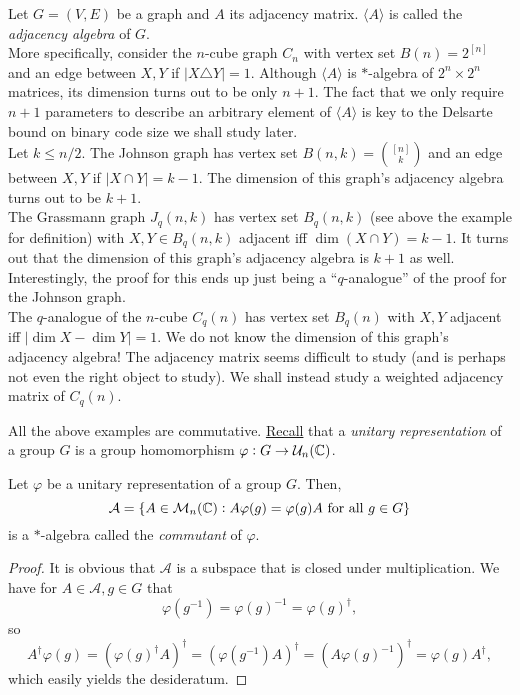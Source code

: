 	\begin{fex}
		\label{exmp: star-alg}
		Let $G = (V,E)$ be a graph and $A$ its adjacency matrix. $\langle A\rangle$ is called the \emph{adjacency algebra} of $G$. \\

		More specifically, consider the $n$-cube graph $C_n$ with vertex set $B(n)=2^{[n]}$ and an edge between $X,Y$ if $|X \triangle Y| = 1$. Although $\langle A\rangle$ is $*$-algebra of $2^n \times 2^n$ matrices, its dimension turns out to be only $n+1$. The fact that we only require $n+1$ parameters to describe an arbitrary element of $\langle A\rangle$ is key to the Delsarte bound on binary code size we shall study later.\\

		Let $k \le n/2$. The Johnson graph has vertex set $B(n,k) = \binom{[n]}{k}$ and an edge between $X,Y$ if $|X \cap Y| = k-1$. The dimension of this graph's adjacency algebra turns out to be $k+1$.\\

		The Grassmann graph $J_q(n,k)$ has vertex set $B_q(n,k)$ (see above the example for definition) with $X,Y \in B_q(n,k)$ adjacent iff $\dim(X \cap Y) = k-1$. It turns out that the dimension of this graph's adjacency algebra is $k+1$ as well. Interestingly, the proof for this ends up just being a ``$q$-analogue'' of the proof for the Johnson graph.\\

		The $q$-analogue of the $n$-cube $C_q(n)$ has vertex set $B_q(n)$ with $X,Y$ adjacent iff $|\dim X - \dim Y| = 1$. We do not know the dimension of this graph's adjacency algebra! The adjacency matrix seems difficult to study (and is perhaps not even the right object to study). We shall instead study a weighted adjacency matrix of $C_q(n)$.
	\end{fex}

	All the above examples are commutative. \href{https://amitrajaraman.github.io/notes/rep-th/main.pdf}{Recall} that a \emph{unitary representation} of a group $G$ is a group homomorphism $\varphi : G \to \mathcal{U}_n(\mathbb{C})$.

	\begin{ftheo}
		Let $\varphi$ be a unitary representation of a group $G$. Then,
		\[ \mathcal{A} = \{A \in \mathcal{M}_n(\mathbb{C}) : A \varphi(g) = \varphi(g) A \text{ for all } g \in G \} \]
		is a $*$-algebra called the \emph{commutant} of $\varphi$.
	\end{ftheo}
	\begin{proof}
		It is obvious that $\mathcal{A}$ is a subspace that is closed under multiplication. We have for $A \in \mathcal{A}, g \in G$ that
		\[ \varphi(g^{-1}) = \varphi(g)^{-1} = \varphi(g)^\dagger, \]
		so
		\[ A^\dagger \varphi(g) = (\varphi(g)^\dagger A)^\dagger = (\varphi(g^{-1}) A)^\dagger = (A \varphi(g)^{-1})^\dagger = \varphi(g) A^\dagger, \]
		which easily yields the desideratum.
	\end{proof}

